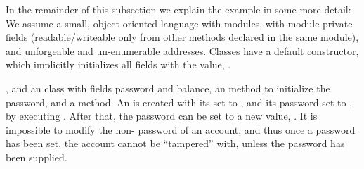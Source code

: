 
\vspace{.1cm}

In the remainder of this subsection we   explain the example in some more detail:
We assume a  small, object oriented language with modules, with module-private fields
(readable/writeable only from other methods declared in the same module),  
and unforgeable and un-enumerable addresses.
Classes have a default constructor, which implicitly initializes all fields   with the  value,
.
   


, and an  class with fields  password and  balance, an  method to initialize the password, and  a  method. 
An  is created with its  set to , and its password set to , \eg by executing .
 After that, the password can be set to a new value,  \eg {} . 
It is impossible to modify the  non- password of an account, and thus once a password has been set, the account cannot be ``tampered'' with, unless the password has been supplied.
 

